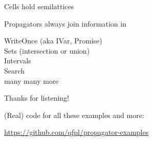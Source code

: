 \documentclass[UKenglish,usenames,dvipsnames,svgnames,table,aspectratio=169,mathserif]{beamer}
\newcommand{\nl}{\vspace{\baselineskip}}
\begin{document}
\begin{frame}
\LARGE \centering

Cells hold semilattices

Propagators always join information in
\end{frame}


\begin{frame}

\centering
WriteOnce (aka IVar, Promise) \\
Sets (intersection or union) \\
Intervals \\
Search \\
many many more
\end{frame}








\begin{frame}
\huge \centering
Thanks for listening!
\nl

\large
(Real) code for all these examples and more:

\url{https://github.com/qfpl/propagator-examples}

\end{frame}
\end{document}
